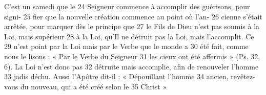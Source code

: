 C'est un samedi que le	 
24	 	Seigneur commence à accomplir des guérisons, pour signi-	 
25	 	fier que la nouvelle création commence au point où l'an-	 
26	 	cienne s'était arrêtée, pour marquer dès le principe que	 
27	 	le Fils de Dieu n'est pas soumis à la Loi, mais supérieur	 
28	 	à la Loi, qu'Il ne détruit pas la Loi, mais l'accomplit. Ce	 
29	 	n'est point par la Loi mais par le Verbe que le monde a	 
30	 	été fait, comme nous le lisons : « Par le Verbe du Seigneur	 
31	 	les cieux ont été affermis » (Ps. 32, 6). La Loi n'est donc pas	 
32	 	détruite mais accomplie, afin de renouveler l'homme	 
33	 	jadis déchu. Aussi l'Apôtre dit-il : « Dépouillant l'homme	 
34	 	ancien, revêtez-vous du nouveau, qui a été créé selon le	 
35	 	Christ »